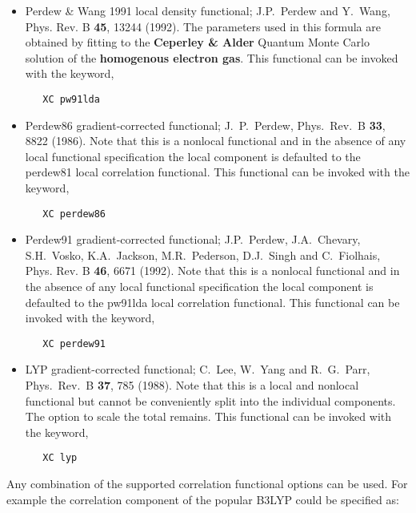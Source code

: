 \begin{itemize}
\item Perdew \& Wang 1991 local density functional;  J.P.~Perdew
  and Y.~Wang, Phys. Rev. B {\bf 45}, 13244 (1992).  The parameters
  used in this formula are obtained by fitting to the {\bf Ceperley \&
  Alder\footnotemark[1]} Quantum Monte Carlo solution of the {\bf
  homogenous electron gas}.  This functional can be invoked with the
  keyword,
  
\begin{verbatim}
   XC pw91lda
\end{verbatim}

\item Perdew86 gradient-corrected functional; J.~P.~Perdew, Phys.~Rev.~B 
  {\bf33}, 8822 (1986).  Note that this is a nonlocal functional and
  in the absence of any local functional specification the local
  component is defaulted to the perdew81 local correlation
  functional. This functional can be invoked with the
  keyword,
  
\begin{verbatim}
   XC perdew86
\end{verbatim}

\item Perdew91 gradient-corrected functional;  J.P.~Perdew,
  J.A.~Chevary, S.H.~Vosko, K.A.~Jackson, M.R.~Pederson, D.J.~Singh
  and C.~Fiolhais, Phys. Rev. B {\bf 46}, 6671 (1992). Note that this
  is a nonlocal functional and in the absence of any local functional 
  specification the local component is defaulted to the pw91lda local 
  correlation functional.  This functional can be invoked with the keyword,

\begin{verbatim}
   XC perdew91
\end{verbatim}

\item LYP gradient-corrected functional; C.~Lee, W.~Yang and
   R.~G.~Parr, Phys.~Rev.~B {\bf 37}, 785 (1988).  Note that this
  is a local and nonlocal functional but cannot be conveniently split
  into the individual components.  The option to scale the total remains.
  This functional can be invoked with the keyword,
  
\begin{verbatim}
   XC lyp
\end{verbatim}

\end{itemize}

Any combination of the supported correlation functional options can be
used.  For example the correlation component of the popular B3LYP
could be specified as:

